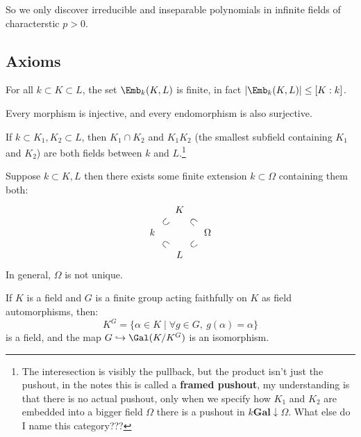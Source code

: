\documentclass{article}
\begin{document}
So we only discover irreducible and inseparable polynomials in infinite fields of characterstic $p>0$.

\subsection{Axioms}

\begin{proposition}[A1]
    For all $k\subset K \subset L$, the set $\Emb_k(K,L)$ is finite, in fact $\abs{\Emb_k(K,L)}\leq [K : k]$.
\end{proposition}

\begin{proposition}[A2]
    Every morphism is injective, and every endomorphism is also surjective.
\end{proposition}

\begin{proposition}[A3]
    If $k\subset K_1,K_2\subset L$, then $K_1\cap K_2$ and $K_1K_2$ (the smallest subfield containing $K_1$ and $K_2$) are both fields between $k$ and $L$.\footnote{The interesection is visibly the pullback, but the product isn't just the pushout, in the notes this is called a \textbf{framed pushout}, my understanding is that there is no actual pushout, only when we specify how $K_1$ and $K_2$ are embedded into a bigger field $\Omega$ there is a pushout in $k\textbf{Gal}\downarrow\Omega$. What else do I name this category???}
\end{proposition}

\begin{proposition}[A4]
    Suppose $k\subset K,L$ then there exists some finite extension $k\subset\Omega$ containing them both: \[
    \begin{tikzcd}[row sep = small, column sep = small]
        & K \arrow[dr, phantom, sloped, "\subset"]\\
        k \arrow[ur, phantom, sloped, "\subset"] \arrow[dr, phantom, sloped, "\subset"] && \Omega\\
        & L \arrow[ur, phantom, sloped, "\subset"]
    \end{tikzcd}
    \] In general, $\Omega$ is not unique.
\end{proposition}

\begin{proposition}[A5]
    If $K$ is a field and $G$ is a finite group acting faithfully on $K$ as field automorphisms, then: \[
    K^G = \{\alpha\in K \mid \forall g\in G, \ g(\alpha) = \alpha \}
    \] is a field, and the map $G\hookrightarrow \Gal(K/K^G)$ is an isomorphism.
\end{proposition}
\end{document}
